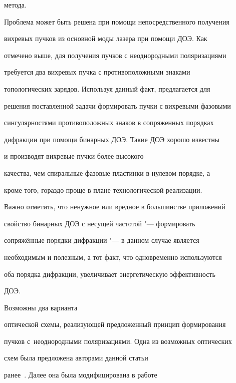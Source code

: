 метода.







Проблема может быть решена при помощи непосредственного получения

вихревых пучков из основной моды лазера при помощи ДОЭ. Как

отмечено выше, для получения пучков с неоднородными поляризациями

требуется два вихревых пучка с противоположными знаками

топологических зарядов. Используя данный факт, предлагается для

решения поставленной задачи формировать пучки с вихревыми фазовыми

сингулярностями противоположных знаков в сопряженных порядках

дифракции при помощи бинарных ДОЭ. Такие ДОЭ хорошо известны

\cite{karpeev:bib10} и производят вихревые пучки более высокого

качества, чем спиральные фазовые пластинки в нулевом порядке, а

кроме того, гораздо проще в плане технологической реализации.

Важно отметить, что ненужное или вредное в большинстве приложений

свойство бинарных ДОЭ с несущей частотой "--- формировать

сопряжённые порядки дифракции "--- в данном случае является

необходимым и полезным, а тот факт, что одновременно используются

оба порядка дифракции, увеличивает энергетическую эффективность

ДОЭ.



\smallskip



 Возможны два варианта

оптической схемы, реализующей предложенный принцип формирования

пучков с~неоднородными поляризациями. Одна из возможных оптических

схем была предложена авторами данной статьи

ранее~\cite{karpeev:bib8}. Далее она была модифицирована в работе


